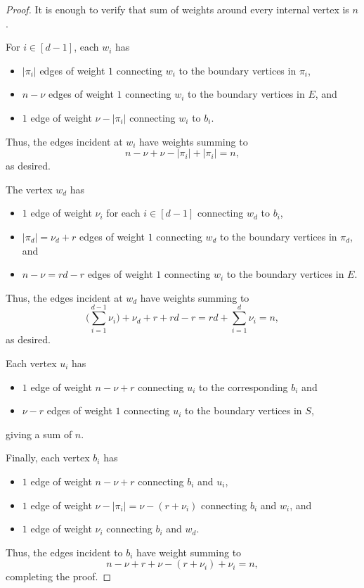 \documentclass[ALCO, Unicode]{cedram}
\numberwithin{equation}{section}
\begin{document}
\begin{proof}
    It is enough to verify that sum of weights around every internal vertex is $n$.

   For $i\in [d-1]$, each $w_i$  has 
\begin{itemize}
    \item $|\pi_i|$ edges of weight $1$ connecting $w_i$ to the boundary vertices in $\pi_i$,
    \item $n-\nu$ edges of weight $1$ connecting $w_i$ to the boundary vertices in $E$, and
    \item $1$ edge of weight $\nu-|\pi_i|$ connecting $w_i$ to $b_i$.
\end{itemize} 
Thus, the edges incident at $w_i$ have weights summing to \[n - \nu + \nu - |\pi_i| + |\pi_i| =n,\] as desired.
 
 The vertex $w_d$ has 
 \begin{itemize}
     \item $1$ edge of weight $\nu_i$ for each $i\in[d-1]$ connecting $w_d$ to $b_i$,
     \item $|\pi_d|=\nu_d+r$ edges of weight $1$ connecting $w_d$ to the boundary vertices in $\pi_d$, and
     \item $n-\nu = rd-r$ edges of weight $1$ connecting $w_i$ to the boundary vertices in $E$.
 \end{itemize}
 Thus, the edges incident at $w_d$ have weights summing to \[\Bigg( \sum_{i=1}^{d-1}\nu_i \Bigg) +\nu_d +r +rd-r = 
 rd + \sum_{i=1}^{d}\nu_i =n,\]
 as desired.
 
 
Each vertex $u_i$ has 
\begin{itemize}
    \item $1$ edge of weight $n-\nu+r$ connecting $u_i$ to the corresponding $b_i$ and
    \item $\nu-r$ edges of weight $1$ connecting $u_i$ to the boundary vertices in $S$,
\end{itemize}
giving a sum of $n$.

Finally, each vertex $b_i$ has 
\begin{itemize}
    \item $1$ edge of weight $n-\nu+r$ connecting $b_i$ and $u_i$,
    \item $1$ edge of weight $\nu-|\pi_i|=\nu-(r+\nu_i)$ connecting $b_i$ and $w_i$, and 
    \item $1$ edge of weight $\nu_i$ connecting $b_i$ and $w_d$.
\end{itemize}
Thus, the edges incident to $b_i$ have weight summing to 
\[
n-\nu + r + \nu-(r+\nu_i) +\nu_i= n,
\]
completing the proof.
\end{proof}
\end{document}
